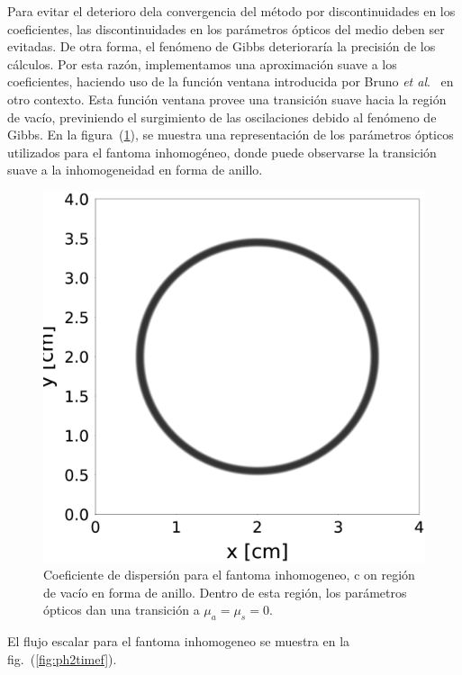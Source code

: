 Para evitar el deterioro dela convergencia del método por discontinuidades 
en los coeficientes, las discontinuidades en los parámetros ópticos del medio 
deben ser evitadas. De otra forma, el fenómeno de Gibbs deterioraría 
la precisión de los cálculos. Por esta razón, implementamos una aproximación 
suave a los coeficientes, haciendo uso de la función ventana introducida 
por Bruno \textit{et al}.~\cite{Bruno2014a} en otro contexto. 
Esta función ventana provee una transición suave hacia la región de 
vacío, previniendo el surgimiento de las oscilaciones debido al 
fenómeno de Gibbs. 
En la figura~(\ref{fig:scattcoef}), se muestra una representación de los 
parámetros ópticos utilizados para el fantoma inhomogéneo, 
donde puede observarse la transición suave a la inhomogeneidad 
en forma de anillo.
 \begin{figure}[h!]
\centering
  \includegraphics[width=0.35\linewidth]{figuras/sigs.eps}
  \caption{Coeficiente de dispersión para el fantoma inhomogeneo, c
  on región de vacío en forma de anillo. Dentro de esta región, 
  los parámetros ópticos dan una transición a  $\mu_a=\mu_s=0$.}
 \label{fig:scattcoef}
\end{figure}
El flujo escalar para el fantoma inhomogeneo se muestra en la fig.~(\ref{fig:ph2timef}). 
